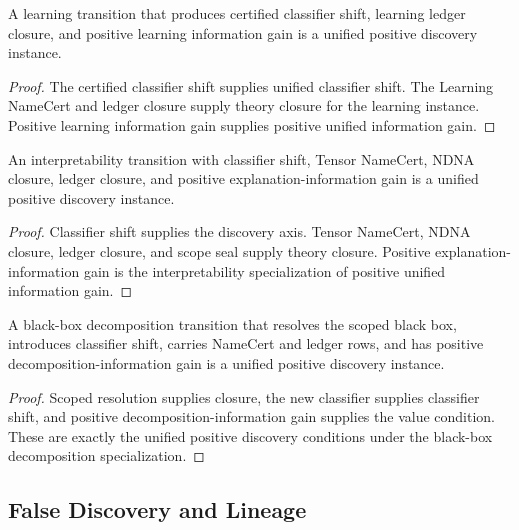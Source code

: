 \begin{theorem}
\label{thm:philosophy-learning-discovery-unified-positive-instance}
A learning transition that produces certified classifier shift, learning
ledger closure, and positive learning information gain is a unified
positive discovery instance.
\end{theorem}
\begin{proof}
The certified classifier shift supplies unified classifier shift. The
Learning NameCert and ledger closure supply theory closure for the
learning instance. Positive learning information gain supplies positive
unified information gain.
\end{proof}

\begin{theorem}
\label{thm:philosophy-interpretability-discovery-unified-positive-instance}
An interpretability transition with classifier shift, Tensor NameCert,
NDNA closure, ledger closure, and positive explanation-information gain
is a unified positive discovery instance.
\end{theorem}
\begin{proof}
Classifier shift supplies the discovery axis. Tensor NameCert, NDNA
closure, ledger closure, and scope seal supply theory closure. Positive
explanation-information gain is the interpretability specialization of
positive unified information gain.
\end{proof}

\begin{theorem}
\label{thm:philosophy-black-box-discovery-resolution-unified-positive-instance}
A black-box decomposition transition that resolves the scoped black box,
introduces classifier shift, carries NameCert and ledger rows, and has
positive decomposition-information gain is a unified positive discovery
instance.
\end{theorem}
\begin{proof}
Scoped resolution supplies closure, the new classifier supplies
classifier shift, and positive decomposition-information gain supplies
the value condition. These are exactly the unified positive discovery
conditions under the black-box decomposition specialization.
\end{proof}

\subsection{False Discovery and Lineage}
\label{subsec:philosophy-unified-false-discovery-lineage}

